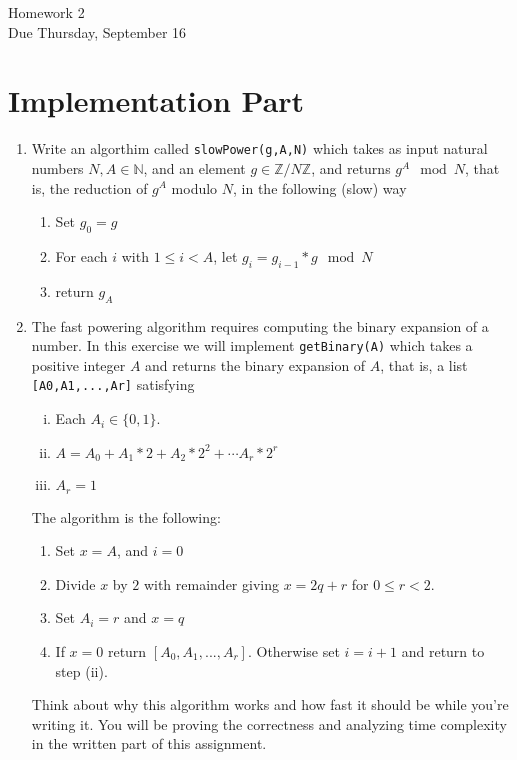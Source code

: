 \documentclass[11pt]{article}
\newcommand{\bN}{\mathbb{N}}
\newcommand{\bZ}{\mathbb{Z}}
\begin{document}
\begin{center}
\Large {Homework 2}\\
\small {Due Thursday, September 16}
\end{center}
\section*{Implementation Part}
\begin{enumerate}
  \item{
  Write an algorthim called \verb|slowPower(g,A,N)| which takes as input natural numbers $N,A\in\bN$, and an element $g\in\bZ/N\bZ$, and returns $g^A\mod N$, that is, the reduction of $g^A$ modulo $N$, in the following (slow) way
  \begin{enumerate}[(1)]
    \item{Set $g_0 = g$}
    \item{For each $i$ with $1\le i<A$, let $g_i = g_{i-1}*g\mod N$}
    \item{return $g_A$}
  \end{enumerate}
  }
  \item{
  The fast powering algorithm requires computing the binary expansion of a number.  In this exercise we will implement \verb|getBinary(A)| which takes a positive integer $A$ and returns the binary expansion of $A$, that is, a list \verb|[A0,A1,...,Ar]| satisfying
  \begin{enumerate}[(i)]
    \item{
    Each $A_i\in\{0,1\}$.
    }
    \item{
    $A = A_0 + A_1*2 + A_2 * 2^2 + \cdots A_r * 2^r$
    }
    \item{
    $A_r = 1$
    }
  \end{enumerate}
  The algorithm is the following:
  \begin{enumerate}[(1)]
    \item{
    Set $x = A$, and $i = 0$
    }
    \item{
    Divide $x$ by $2$ with remainder giving $x = 2q + r$ for $0\le r<2$.
    }
    \item{
    Set $A_i = r$ and $x = q$
    }
    \item{
    If $x = 0$ return $[A_0,A_1,...,A_r]$.  Otherwise set $i = i+1$ and return to step (ii).
    }
  \end{enumerate}
  Think about why this algorithm works and how fast it should be while you're writing it.  You will be proving the correctness and analyzing time complexity in the written part of this assignment.
}
\end{enumerate}
\end{document}
